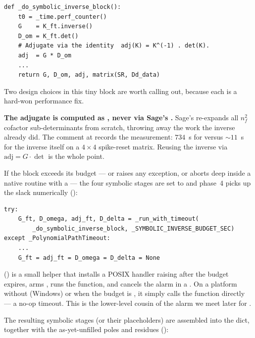 \begin{lstlisting}
def _do_symbolic_inverse_block():
    t0 = _time.perf_counter()
    G    = K_ft.inverse()
    D_om = K_ft.det()
    # Adjugate via the identity  adj(K) = K^(-1) . det(K).
    adj  = G * D_om
    ...
    return G, D_om, adj, matrix(SR, Dd_data)
\end{lstlisting}

Two design choices in this tiny block are worth calling out, because each is a
hard-won performance fix.

\begin{gotcha}
\textbf{The adjugate is computed as , never via Sage's
.} Sage's  re-expands all $n_f^2$
cofactor sub-determinants from scratch, throwing away the work the inverse
already did. The comment at  records the
measurement: $734$~s for  versus $\sim11$~s for the inverse
itself on a $4\times4$ spike-reset matrix. Reusing the inverse via
$\mathrm{adj} = G\cdot\det$ is the whole point.
\end{gotcha}

If the block exceeds its budget --- or raises any exception, or aborts deep inside
a native routine with a  --- the four symbolic stages are set to
 and phase~4 picks up the slack numerically
():

\begin{lstlisting}
try:
    G_ft, D_omega, adj_ft, D_delta = _run_with_timeout(
        _do_symbolic_inverse_block, _SYMBOLIC_INVERSE_BUDGET_SEC)
except _PolynomialPathTimeout:
    ...
    G_ft = adj_ft = D_omega = D_delta = None
\end{lstlisting}

 () is a small helper
that installs a POSIX  handler raising 
after the budget expires, arms , runs the function, and cancels
the alarm in a . On a platform without  (Windows) or
when the budget is , it simply calls the function directly --- a no-op
timeout. This is the lower-level cousin of the  alarm we meet
later for .

The resulting symbolic stages (or their  placeholders) are assembled
into the  dict, together with the as-yet-unfilled poles and residues
():

